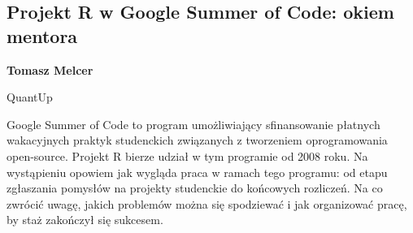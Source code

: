 \documentclass[\main/boa.tex]{subfiles}
\begin{document}
\subsection{Projekt R w Google Summer of Code: okiem mentora}

\begin{minipage}{0.915\textwidth}
	\centering
  {\bf {} Tomasz Melcer}
\end{minipage}

\vskip 0.3cm

\begin{affiliations}
\begin{minipage}{0.915\textwidth}
\centering
QuantUp \\[-2pt]
\end{minipage}
\end{affiliations}

\vskip 0.8cm

Google Summer of Code to program umożliwiający sfinansowanie płatnych wakacyjnych praktyk studenckich związanych z tworzeniem oprogramowania open-source. Projekt R bierze udział w tym programie od 2008 roku. Na wystąpieniu opowiem jak wygląda praca w ramach tego programu: od etapu zgłaszania pomysłów na projekty studenckie do końcowych rozliczeń. Na co zwrócić uwagę, jakich problemów można się spodziewać i jak organizować pracę, by staż zakończył się sukcesem. 
\end{document}

